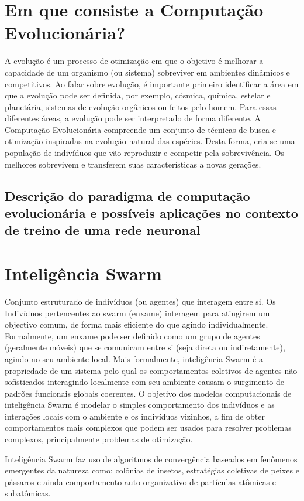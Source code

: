 \documentclass[10pt]{article}
\begin{document}
\section{Em que consiste a Computação Evolucionária?}\label{sec:comp-evo}
    A evolução é um processo de otimização em que o objetivo é melhorar a capacidade de um organismo (ou sistema) sobreviver em ambientes dinâmicos e competitivos.
    Ao falar sobre evolução, é importante primeiro identificar a área em que a evolução pode ser definida, por exemplo, cósmica, química, estelar e planetária,
sistemas de evolução orgânicos ou feitos pelo homem. Para essas diferentes áreas, a evolução pode
ser interpretado de forma diferente. 
    A Computação Evolucionária compreende um conjunto de técnicas de busca e otimização inspiradas na 
evolução natural das espécies. Desta forma, cria-se uma população de indivíduos que vão reproduzir e 
competir pela sobrevivência. Os melhores sobrevivem e transferem suas características a novas gerações.


\subsection{Descrição do paradigma de computação evolucionária e possíveis aplicações no contexto de treino de uma rede neuronal}\label{sec:desc-para}

\section{Inteligência Swarm}\label{sec:ev-da-org}
Conjunto estruturado de indivíduos (ou agentes) que interagem entre si.
Os Indivíduos pertencentes ao swarm (enxame) interagem para atingirem um objectivo comum,
de forma mais eficiente do que agindo individualmente.
Formalmente, um enxame pode ser definido como um grupo de agentes (geralmente móveis) que se comunicam entre si (seja direta ou indiretamente), agindo no seu ambiente local.
 Mais formalmente, inteligência Swarm é a propriedade de um sistema pelo qual os comportamentos coletivos de agentes não sofisticados interagindo localmente com seu ambiente causam o surgimento de padrões funcionais globais coerentes.
 O objetivo dos modelos computacionais de inteligência Swarm é modelar o simples
comportamento dos indivíduos e as interações locais com o ambiente e os indivíduos vizinhos, a fim de obter comportamentos mais complexos que podem ser usados para resolver problemas complexos, principalmente problemas de otimização.

Inteligência Swarm faz uso de algoritmos de convergência baseados em fenômenos emergentes da natureza como: colônias de insetos, estratégias coletivas de peixes e pássaros e ainda comportamento auto-organizativo de partículas atômicas e subatômicas.
\end{document}

